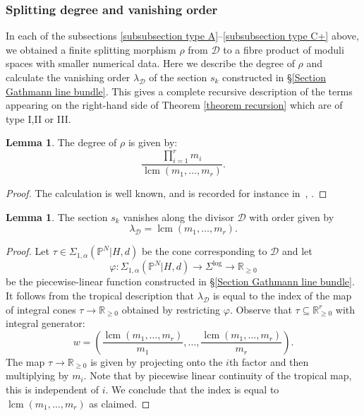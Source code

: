 \documentclass[11pt]{amsart}
\newcommand{\lcm}{\operatorname{lcm}}
\newcommand{\PP}{\mathbb P}
\renewcommand{\to}{\rightarrow}
\newcommand{\Dcal}{\mathcal{D}}
\newcommand{\RR}{\mathbb{R}}
\theoremstyle{definition}
\newtheorem{lemma}[thm]{Lemma}
\theoremstyle{definition}
\begin{document}
\subsubsection{Splitting degree and vanishing order} \label{subsubsection splitting degree} In each of the subsections \ref{subsubsection type A}--\ref{subsubsection type C+} above, we obtained a finite splitting morphism $\rho$ from $\Dcal$ to a fibre product of moduli spaces with smaller numerical data. Here we describe the degree of $\rho$ and calculate the vanishing order $\lambda_\Dcal$ of the section $s_k$ constructed in \S \ref{Section Gathmann line bundle}. This gives a complete recursive description of the terms appearing on the right-hand side of Theorem \ref{theorem recursion} which are of type I,II or III.

\begin{lemma}\label{lem:saturation} The degree of $\rho$ is given by:
\begin{equation*} \label{degree of gluing} \dfrac{\prod_{i=1}^r m_i}{\lcm(m_1,\ldots,m_r)}. \end{equation*}\end{lemma}
\begin{proof} The calculation is well known, and is recorded for instance in~\cite[Section~7.9]{ChenDegeneration}, \cite[Section~5.3]{ACGSDecomposition}.
\end{proof}

\begin{lemma}\label{lemma vanishing order} The section $s_k$ vanishes along the divisor $\Dcal$ with order given by 
\[
\lambda_\Dcal = \lcm(m_1,\ldots,m_r).
\] 
\end{lemma}
\begin{proof} Let $\tau \in \Sigma_{1,\alpha}(\PP^N|H,d)$ be the cone corresponding to $\Dcal$ and let
\begin{equation*} \varphi \colon \Sigma_{1,\alpha}(\PP^N|H,d) \to \Sigma^{\log} \to \RR_{\geq 0} \end{equation*}
be the piecewise-linear function constructed in \S \ref{Section Gathmann line bundle}. It follows from the tropical description that $\lambda_\Dcal$ is equal to the index of the map of integral cones $\tau \to \RR_{\geq 0}$ obtained by restricting $\varphi$. Observe that $\tau \subseteq \RR_{\geq 0}^r$ with integral generator:
\begin{equation*} w = \left( \dfrac{\lcm(m_1,\ldots,m_r)}{m_1},\ldots,\dfrac{\lcm(m_1,\ldots,m_r)}{m_r} \right).\end{equation*}
The map $\tau \to \RR_{\geq 0}$ is given by projecting onto the $i$th factor and then multiplying by $m_i$. Note that by piecewise linear continuity of the tropical map, this is independent of $i$. We conclude that the index is equal to $\lcm(m_1,\ldots,m_r)$ as claimed.\end{proof}
\end{document}
